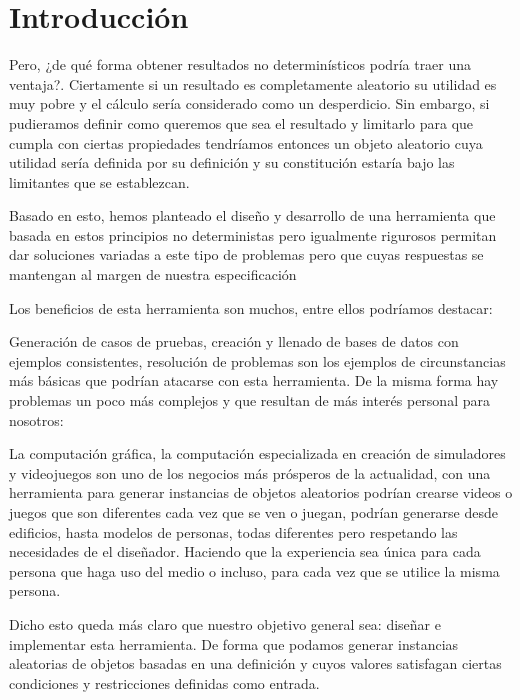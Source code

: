 \chapter{Introducción}

\label{sect:planteamiento}
Pero, ¿de qué forma obtener resultados no determinísticos podría traer una ventaja?.
Ciertamente si un resultado es completamente aleatorio su utilidad es muy pobre y 
el cálculo sería considerado como un desperdicio. Sin embargo, si pudieramos definir
como queremos que sea el resultado y limitarlo para que cumpla con ciertas propiedades
tendríamos entonces un objeto aleatorio cuya utilidad sería definida por su definición y
su constitución estaría bajo las limitantes que se establezcan.

Basado en esto, hemos planteado el diseño y desarrollo de una herramienta que basada en
estos principios no deterministas pero igualmente rigurosos permitan dar soluciones variadas
a este tipo de problemas pero que cuyas respuestas se mantengan al margen de nuestra
especificación

Los beneficios de esta herramienta son muchos, entre ellos podríamos destacar:

Generación de casos de pruebas, creación y llenado de bases de datos con ejemplos consistentes, 
resolución de problemas son los ejemplos de circunstancias más básicas que podrían atacarse con
esta herramienta. De la misma forma hay problemas un poco más complejos y que resultan de más
interés personal para nosotros:

La computación gráfica, la computación especializada en creación de simuladores y videojuegos
son uno de los negocios más prósperos de la actualidad, con una herramienta para generar
instancias de objetos aleatorios podrían crearse videos o juegos que son diferentes cada vez
que se ven o juegan, podrían generarse desde edificios, hasta modelos de personas, todas
diferentes pero respetando las necesidades de el diseñador. Haciendo que la experiencia sea
única para cada persona que haga uso del medio o incluso, para cada vez que se utilice la misma
persona.

Dicho esto queda más claro que nuestro objetivo general sea: diseñar e implementar esta 
herramienta. De forma que podamos generar instancias aleatorias de objetos basadas en una 
definición y cuyos valores satisfagan ciertas condiciones y restricciones definidas como entrada.

